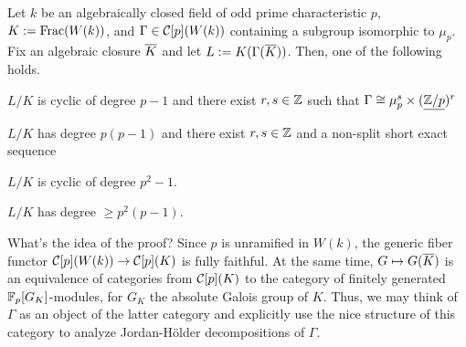 \documentclass[11pt]{article}
\begin{document}
\begin{proposition}
Let $k$ be an algebraically closed field of odd prime characteristic $p$, $K:=\operatorname{Frac}(W(k))$, and $\Gamma\in\mathcal{C}[p](W(k))$ containing a subgroup isomorphic to $\mu_p$. Fix an algebraic closure $\overline{K}$ and let $L:=K(\Gamma(\overline{K}))$. Then, one of the following holds.
\begin{enum}{\arabic}
\item $L/K$ is cyclic of degree $p-1$ and there exist $r,s\in\mathbb{Z}$ such that $\Gamma\cong\mu_p^s\times(\underline{\mathbb{Z}/p})^r$

\item $L/K$ has degree $p(p-1)$ and there exist $r,s\in\mathbb{Z}$ and a non-split short exact sequence
\begin{center}
\end{center}

\item $L/K$ is cyclic of degree $p^2-1$.

\item $L/K$ has degree $\geq p^2(p-1)$.
\end{enum}
\end{proposition}

What's the idea of the proof? Since $p$ is unramified in $W(k)$, the generic fiber functor $\mathcal{C}[p](W(k))\to\mathcal{C}[p](K)$ is fully faithful. At the same time, $G\mapsto G(\overline{K})$ is an equivalence of categories from $\mathcal{C}[p](K)$ to the category of finitely generated $\mathbb{F}_p[G_K]$-modules, for $G_K$ the absolute Galois group of $K$. Thus, we may think of $\Gamma$ as an object of the latter category and explicitly use the nice structure of this category to analyze Jordan-H\"{o}lder decompositions of $\Gamma$.
\end{document}
